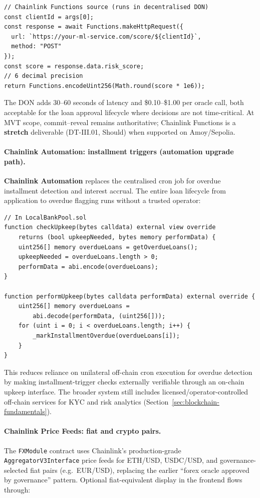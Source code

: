 \documentclass[12pt,a4paper]{report}
\begin{document}
\begin{verbatim}
// Chainlink Functions source (runs in decentralised DON)
const clientId = args[0];
const response = await Functions.makeHttpRequest({
  url: `https://your-ml-service.com/score/${clientId}`,
  method: "POST"
});
const score = response.data.risk_score;
// 6 decimal precision
return Functions.encodeUint256(Math.round(score * 1e6));
\end{verbatim}

The DON adds 30--60 seconds of latency and \$0.10--\$1.00 per oracle call, both acceptable for the loan approval lifecycle where decisions are not time-critical. At MVT scope, commit--reveal remains authoritative; Chainlink Functions is a \textbf{stretch} deliverable (DT-III.01, Should) when supported on Amoy/Sepolia.

\paragraph{Chainlink Automation: installment triggers (automation upgrade path).}
\textbf{Chainlink Automation} replaces the centralised cron job for overdue installment detection and interest accrual. The entire loan lifecycle from application to overdue flagging runs without a trusted operator:

\begin{verbatim}
// In LocalBankPool.sol
function checkUpkeep(bytes calldata) external view override
    returns (bool upkeepNeeded, bytes memory performData) {
    uint256[] memory overdueLoans = getOverdueLoans();
    upkeepNeeded = overdueLoans.length > 0;
    performData = abi.encode(overdueLoans);
}

function performUpkeep(bytes calldata performData) external override {
    uint256[] memory overdueLoans =
        abi.decode(performData, (uint256[]));
    for (uint i = 0; i < overdueLoans.length; i++) {
        _markInstallmentOverdue(overdueLoans[i]);
    }
}
\end{verbatim}

This reduces reliance on unilateral off-chain cron execution for overdue detection by making installment-trigger checks externally verifiable through an on-chain upkeep interface. The broader system still includes licensed/operator-controlled off-chain services for KYC and risk analytics (Section~\ref{sec:blockchain-fundamentals}).

\paragraph{Chainlink Price Feeds: fiat and crypto pairs.}
The \texttt{FXModule} contract uses Chainlink's production-grade \texttt{AggregatorV3Interface} price feeds for ETH/USD, USDC/USD, and governance-selected fiat pairs (e.g.\ EUR/USD), replacing the earlier ``forex oracle approved by governance'' pattern. Optional fiat-equivalent display in the frontend flows through:
\end{document}
